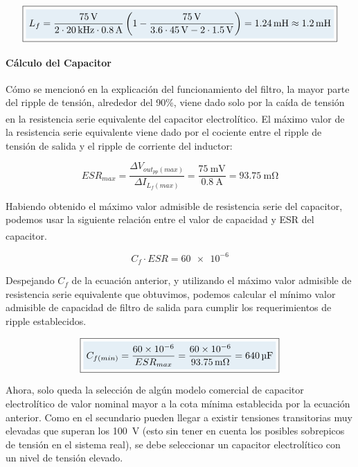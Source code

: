 \begin{equation}\label{Lf_valor}
    \boxed{
    \highlight{L_f = \frac{\SI{75}{\volt}}{2\cdot\SI{20}{\kilo\hertz}\cdot\SI{0.8}{\ampere}}\left(1-\frac{\SI{75}{\volt}}{\num{3.6}\cdot\SI{45}{\volt}-2\cdot\SI{1.5}{\volt}}\right) = \SI{1.24}{\milli\henry} \approx \SI{1.2}{\milli\henry}}
    }
\end{equation}

\paragraph{Cálculo del Capacitor}

Cómo se mencionó en la explicación del funcionamiento del filtro, la mayor parte del ripple de tensión, alrededor del 90\%, viene dado solo por la caída de tensión en la resistencia serie equivalente del capacitor electrolítico.\textsuperscript{\cite{SoftSwitchPWM}} El máximo valor de la resistencia serie equivalente viene dado por el cociente entre el ripple de tensión de salida y el ripple de corriente del inductor:

\begin{equation*}
    ESR_{max} = \frac{\Delta V_{out_{pp}(max)}}{\Delta I_{L_f(max)}} = \frac{\SI{75}{\milli\volt}}{\SI{0.8}{\ampere}} = \SI{93.75}{\milli\ohm}
\end{equation*}

Habiendo obtenido el máximo valor admisible de resistencia serie del capacitor, podemos usar la siguiente relación entre el valor de capacidad y ESR del capacitor.\textsuperscript{\cite{SoftSwitchPWM}}

\begin{equation}\label{Cf-ESR}
    C_f\cdot ESR = \num{60e-6}
\end{equation}

Despejando $C_f$ de la ecuación anterior, y utilizando el máximo valor admisible de resistencia serie equivalente que obtuvimos, podemos calcular el mínimo valor admisible de capacidad de filtro de salida para cumplir los requerimientos de ripple establecidos.

\begin{equation}\label{Cf_valor}
    \boxed{
    \highlight{C_{f(min)} = \frac{\num{60e-6}}{ESR_{max}} = \frac{\num{60e-6}}{\SI{93.75}{\milli\ohm}} = \SI{640}{\micro\farad}}
    }
\end{equation}

Ahora, solo queda la selección de algún modelo comercial de capacitor electrolítico de valor nominal mayor a la cota mínima establecida por la ecuación anterior. Como en el secundario pueden llegar a existir tensiones transitorias muy elevadas que superan los \SI{100}{\volt} (esto sin tener en cuenta los posibles sobrepicos de tensión en el sistema real), se debe seleccionar un capacitor electrolítico con un nivel de tensión elevado.\\

